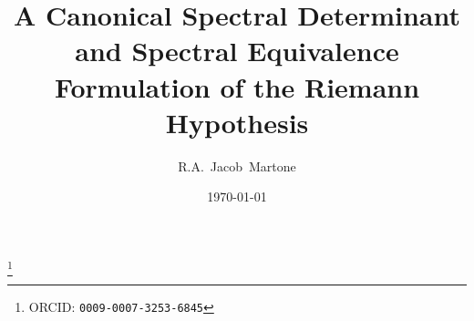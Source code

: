 
\title[A Spectral Determinant for the Riemann Hypothesis]%
  {A Canonical Spectral Determinant and Spectral Equivalence Formulation of the Riemann Hypothesis}

\author[R.A.~Jacob~Martone]{R.A.~Jacob~Martone}
\address{Radio Park Area, Fresno, California, USA}
\thanks{ORCID: \texttt{0009-0007-3253-6845}}


\date{\today}
